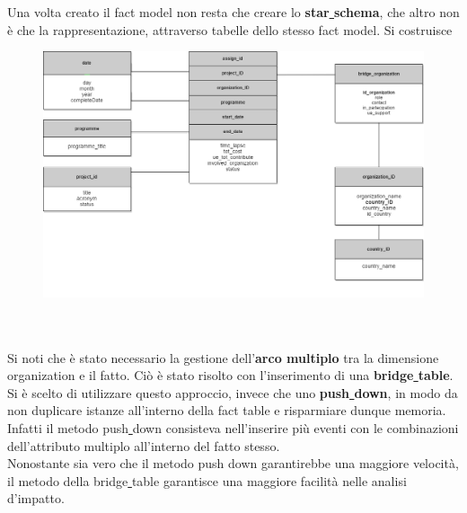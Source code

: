 \documentclass[12pt,a4paper]{report}
\begin{document}
\newpage\noindent
Una volta creato il fact model non resta che creare lo \textbf{star\underline{ }schema}, che altro non è che la rappresentazione, attraverso tabelle dello stesso fact model. Si costruisce 
\begin{figure}[htbp]
	\centering
	\includegraphics[scale=0.50]{star_scheme}
\end{figure}
\\\\\noindent
Si noti che è stato necessario la gestione dell'\textbf{arco multiplo} tra la dimensione organization e il fatto. Ciò è stato risolto con l'inserimento di una \textbf{bridge\underline{ }table}.\\\noindent
Si è scelto di utilizzare questo approccio, invece che uno \textbf{push\underline{ }down}, in modo da non duplicare istanze all'interno della fact table e risparmiare dunque memoria. Infatti il metodo push\underline{ }down consisteva nell'inserire più eventi con le combinazioni dell'attributo multiplo all'interno del fatto stesso.\\\noindent Nonostante sia vero che il metodo push down garantirebbe una maggiore velocità, il metodo della bridge\underline{ }table garantisce una maggiore facilità nelle analisi d'impatto.
\end{document}
